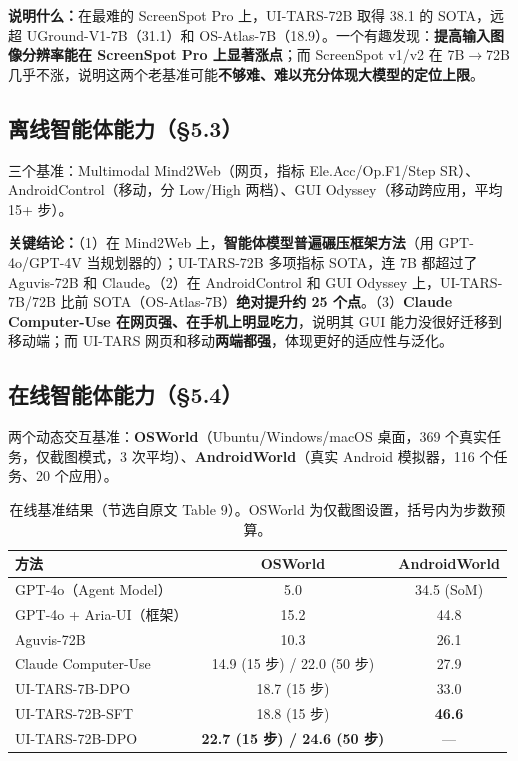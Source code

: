 \documentclass[11pt,UTF8,fontset=fandol]{ctexart}
\begin{document}
\textbf{说明什么：}在最难的 ScreenSpot Pro 上，UI-TARS-72B 取得 38.1 的 SOTA，远超 UGround-V1-7B（31.1）和 OS-Atlas-7B（18.9）。一个有趣发现：\textbf{提高输入图像分辨率能在 ScreenSpot Pro 上显著涨点}；而 ScreenSpot v1/v2 在 7B$\rightarrow$72B 几乎不涨，说明这两个老基准可能\textbf{不够难、难以充分体现大模型的定位上限}。

\subsection{离线智能体能力（§5.3）}

三个基准：Multimodal Mind2Web（网页，指标 Ele.Acc/Op.F1/Step SR）、AndroidControl（移动，分 Low/High 两档）、GUI Odyssey（移动跨应用，平均 15+ 步）。

\textbf{关键结论：}（1）在 Mind2Web 上，\textbf{智能体模型普遍碾压框架方法}（用 GPT-4o/GPT-4V 当规划器的）；UI-TARS-72B 多项指标 SOTA，连 7B 都超过了 Aguvis-72B 和 Claude。（2）在 AndroidControl 和 GUI Odyssey 上，UI-TARS-7B/72B 比前 SOTA（OS-Atlas-7B）\textbf{绝对提升约 25 个点}。（3）\textbf{Claude Computer-Use 在网页强、在手机上明显吃力}，说明其 GUI 能力没很好迁移到移动端；而 UI-TARS 网页和移动\textbf{两端都强}，体现更好的适应性与泛化。

\subsection{在线智能体能力（§5.4）}

两个动态交互基准：\textbf{OSWorld}（Ubuntu/Windows/macOS 桌面，369 个真实任务，仅截图模式，3 次平均）、\textbf{AndroidWorld}（真实 Android 模拟器，116 个任务、20 个应用）。

\begin{table}[H]\centering
\caption{在线基准结果（节选自原文 Table 9）。OSWorld 为仅截图设置，括号内为步数预算。}
\label{tab:online}
\small
\begin{tabular}{lcc}
\toprule
方法 & OSWorld & AndroidWorld \\
\midrule
GPT-4o（Agent Model） & 5.0 & 34.5 (SoM) \\
GPT-4o + Aria-UI（框架） & 15.2 & 44.8 \\
Aguvis-72B & 10.3 & 26.1 \\
Claude Computer-Use & 14.9 (15 步) / 22.0 (50 步) & 27.9 \\
UI-TARS-7B-DPO  & 18.7 (15 步) & 33.0 \\
UI-TARS-72B-SFT & 18.8 (15 步) & \textbf{46.6} \\
UI-TARS-72B-DPO & \textbf{22.7 (15 步) / 24.6 (50 步)} & --- \\
\bottomrule
\end{tabular}
\end{table}
\end{document}
